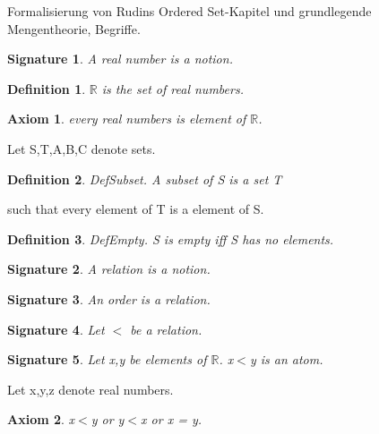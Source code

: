 \documentclass{article}
\newenvironment{forthel}{\begin{leftbar}}{\end{leftbar}}
\newtheorem{axiom}{Axiom}
\newtheorem{definition}{Definition}
\newtheorem{signature}{Signature}
\begin{document}
Formalisierung von Rudins Ordered Set-Kapitel und grundlegende Mengentheorie, Begriffe.

\begin{forthel}
[set/-s] [element/-s] [belong/-s] [subset/-s] [relation/-s] [number/-s]

\begin{signature} A real number is a notion.

\end{signature}
\begin{definition} $\mathbb{R}$ is the set of real numbers. 

\end{definition}
\begin{axiom} every real numbers is element of $\mathbb{R}$.

\end{axiom}


Let S,T,A,B,C denote sets.

\begin{definition} DefSubset.   A subset of S is a set T

\end{definition}
such that every element of T is a element of S.

\begin{definition} DefEmpty.    S is empty iff S has no elements.

\end{definition}

\begin{signature} A relation is a notion.

\end{signature}

\begin{signature} An order is a relation.

\end{signature}

\begin{signature}Let $<$ be a relation.

\end{signature}

\begin{signature} Let x,y be elements of $\mathbb{R}$. x$<$y is an atom.

\end{signature}

Let x,y,z denote real numbers.

\begin{axiom} x$<$y or y$<$x or x = y.


\end{axiom}
\end{forthel}
\end{document}
